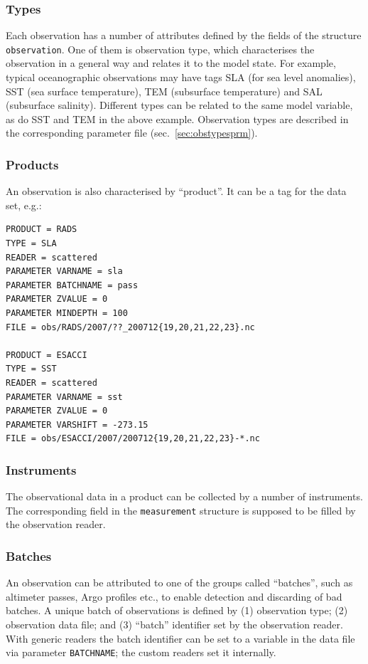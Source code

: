\documentclass[11pt]{report}
\begin{document}
\subsubsection{Types}
\label{sec:types}

Each observation has a number of attributes defined by the fields of the structure \verb|observation|.
One of them is observation type, which characterises the observation in a general way and relates it to the model state.
For example, typical oceanographic observations may have tags SLA (for sea level anomalies), SST (sea surface temperature), TEM (subsurface temperature) and SAL (subsurface salinity).
Different types can be related to the same model variable, as do SST and TEM in the above example.
Observation types are described in the corresponding parameter file (sec.~\ref{sec:obstypesprm}).

\subsubsection{Products}

An observation is also characterised by ``product''.
It can be a tag for the data set, e.g.:
\begin{Verbatim}[frame=single,fontsize=\footnotesize]
PRODUCT = RADS
TYPE = SLA
READER = scattered
PARAMETER VARNAME = sla
PARAMETER BATCHNAME = pass
PARAMETER ZVALUE = 0
PARAMETER MINDEPTH = 100
FILE = obs/RADS/2007/??_200712{19,20,21,22,23}.nc

PRODUCT = ESACCI
TYPE = SST
READER = scattered
PARAMETER VARNAME = sst
PARAMETER ZVALUE = 0
PARAMETER VARSHIFT = -273.15
FILE = obs/ESACCI/2007/200712{19,20,21,22,23}-*.nc
\end{Verbatim}

\subsubsection{Instruments}

The observational data in a product can be collected by a number of instruments.
The corresponding field in the \verb|measurement| structure is supposed to be filled by the observation reader.

\subsubsection{Batches}

An observation can be attributed to one of the groups called ``batches'', such as altimeter passes, Argo profiles etc., to enable detection and discarding of bad batches.
A unique batch of observations is defined by (1) observation type; (2) observation data file; and (3) ``batch'' identifier set by the observation reader.
With generic readers the batch identifier can be set to a variable in the data file via parameter \verb|BATCHNAME|; the custom readers set it internally.
\end{document}

